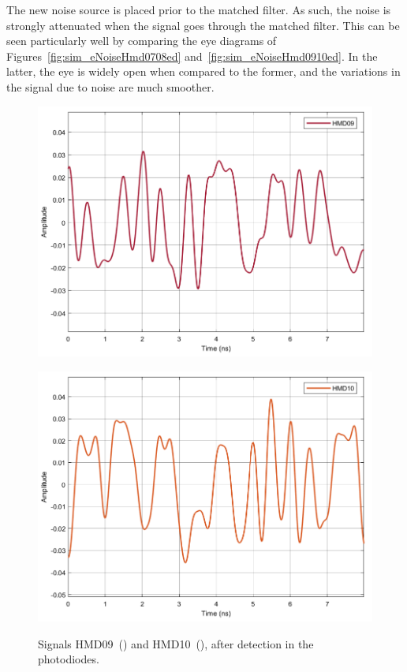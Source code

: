 The new noise source is placed prior to the matched filter. As such, the noise 
is strongly attenuated when the signal goes through the matched filter. This 
can be seen particularly well by comparing the eye diagrams of 
Figures~\ref{fig:sim_eNoiseHmd0708ed} and~\ref{fig:sim_eNoiseHmd0910ed}. In the 
latter, the eye is widely open when compared to the former, and the variations 
in the signal due to noise are much smoother.

\begin{figure}[H]
	\centering
	\begin{minipage}{0.45\textwidth}
		\centering
		\includegraphics[width=1\textwidth]		
		{./sdf/m_qam_system/figures/simulations/03_eNoise/HMD09.pdf}
		\subcaption{}\label{fig:sim_eNoiseHmd09}
	\end{minipage}
	\begin{minipage}{0.45\textwidth}
		\centering
		\includegraphics[width=1\textwidth]
		{sdf/m_qam_system/figures/simulations/03_eNoise/HMD10.pdf}
		\subcaption{}\label{fig:sim_eNoiseHmd10}
	\end{minipage}
	\caption{Signals HMD09~() and 
		HMD10~(), after detection in the 
		photodiodes.}\label{fig:sim_eNoiseHmd0910}
\end{figure}


